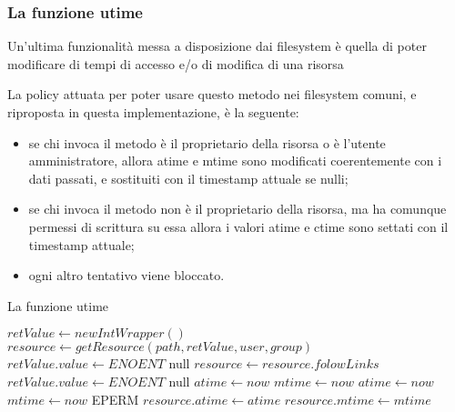 \newpage

\subsubsection {La funzione utime}
Un'ultima funzionalità messa a disposizione dai filesystem è quella di poter modificare di tempi di accesso e/o di modifica di una risorsa

La policy attuata per poter usare questo metodo nei filesystem comuni, e riproposta in questa implementazione, è la seguente:
\begin{itemize}
\item se chi invoca il metodo è il proprietario della risorsa o è l'utente amministratore, allora atime e mtime sono modificati coerentemente con i dati passati, e sostituiti con il timestamp attuale se nulli;
\item se chi invoca il metodo non è il proprietario della risorsa, ma ha comunque permessi di scrittura su essa allora i valori atime e ctime sono settati con il timestamp attuale;
\item ogni altro tentativo viene bloccato.
\end{itemize}
\begin{algorithm}
\begin{algorithmic}[5]
\caption{La funzione utime}
	\State $retValue \gets new IntWrapper()$
	\State $resource \gets getResource(path, retValue, user, group)$
		\State $retValue.value \gets ENOENT$
		\State \Return null
	\EndIf
		\State $resource \gets resource.folowLinks$
	\EndIf
		\State $retValue.value \gets ENOENT$
		\State \Return null
	\EndIf
			\State $atime \gets now$
		\EndIf
			\State $mtime \gets now$
		\EndIf
		\State $atime \gets now$
		\State $mtime \gets now$
	\Else
		\State \Return EPERM
	\EndIf
	\State $resource.atime \gets atime$
	\State $resource.mtime \gets mtime$
	\State {}
\EndFunction
\end{algorithmic}
\end{algorithm}
